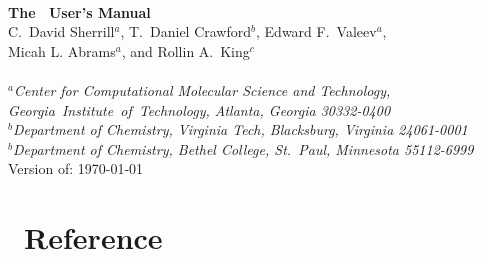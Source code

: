 \documentclass[12pt]{article}
\begin{document}


\begin{center}
\ \\
\vspace{2.0in}
{\bf {\Large The \PSIthree\ User's Manual}} \\
\vspace{0.5in}
C.~David Sherrill$^a$, T.~Daniel Crawford$^b$, Edward F.~Valeev$^a$, \\
Micah L. Abrams$^a$, and Rollin A.~King$^c$ \\
\ \\
{\em $^a$Center for Computational Molecular Science and Technology, 
  \mbox{Georgia Institute of Technology,} Atlanta, Georgia 30332-0400} \\
\vspace{0.1in}
{\em $^b$Department of Chemistry, Virginia Tech, Blacksburg, Virginia 
  24061-0001} \\
\vspace{0.1in}
{\em $^b$Department of Chemistry, Bethel College, St.\ Paul, Minnesota 
  55112-6999}
\ \\
\vspace{0.3in}
Version of: \today
\end{center}

\thispagestyle{empty}

\newpage
\tableofcontents
\newpage





  
  
  
  
  



\appendix
\section{\PSIthree\ Reference}\label{PSI_Reference}


%



\end{document}
